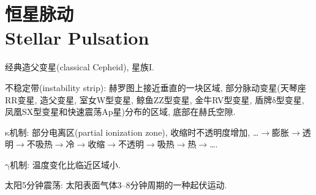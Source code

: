 \chapter{恒星脉动\\Stellar Pulsation}

经典造父变星(classical Cepheid), 星族I.

不稳定带(instability strip): 赫罗图上接近垂直的一块区域, 部分脉动变星(天琴座RR变星, 造父变星, 室女W型变星, 鲸鱼ZZ型变星, 金牛RV型变星, 盾牌$\mathrm{δ}$型变星, 凤凰SX型变星和快速震荡Ap星)分布的区域, 底部在赫氏空隙.

$\mathrm{\kappa}$机制: 部分电离区(partial ionization zone), 收缩时不透明度增加, \dots$\to$膨胀$\to$透明$\to$不吸热$\to$冷$\to$收缩$\to$不透明$\to$吸热$\to$热$\to$\dots.

$\mathrm{\gamma}$机制: 温度变化比临近区域小.

太阳5分钟震荡: 太阳表面气体3--8分钟周期的一种起伏运动.
